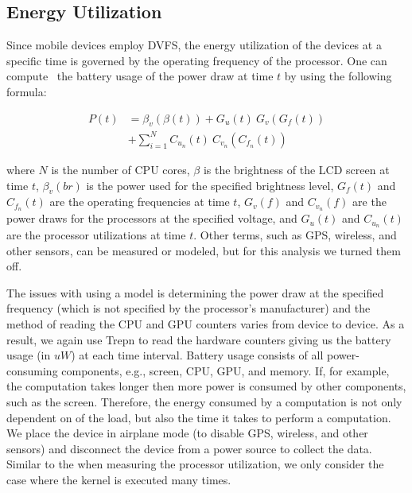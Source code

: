 \subsection{Energy Utilization}


Since mobile devices employ DVFS,
  the energy utilization of the devices at a specific time is governed by
  the operating frequency of the processor.
One can compute~\cite{zhang2010accurate, dong2011self} the battery usage of the
power draw at time $t$ by using the following formula:

\begin{align*}
P(t) &= \beta_v(\beta(t)) + G_u(t) ~ G_v(G_f(t)) \\
     &+ \sum_{i=1}^{N} C_{u_n}(t) ~ C_{v_n}(C_{f_n}(t))
\end{align*}

where $N$ is the number of CPU cores, $\beta$ is the brightness of the LCD screen at time $t$, $\beta_v(br)$ is the power used for the specified brightness level, $G_f(t)$ and $C_{f_n}(t)$ are the operating frequencies at time $t$, $G_v(f)$ and $ C_{v_n}(f)$ are the power draws for the processors at the specified voltage, and $G_u(t)$ and $C_{u_n}(t)$ are the processor utilizations at time $t$.
Other terms, such as GPS, wireless, and other sensors, can be measured or modeled, but for this analysis we turned them off.

The issues with using a model is determining the power draw at the specified
  frequency (which is not specified by the processor's manufacturer) and the method of reading
  the CPU and GPU counters varies from device to device.
As a result, we again use Trepn to read the hardware counters giving us the battery usage (in $uW$) at each time interval.
Battery usage consists of all power-consuming components, e.g., screen, CPU, GPU, and memory.
If, for example, the computation takes longer then more power is consumed by other components, such as the screen.
Therefore, the energy consumed by a computation is not only dependent on of the load, but also the time it takes to perform a computation.
We place the device in airplane mode (to disable GPS, wireless, and other sensors) and disconnect the device from a power source to 
  collect the data.
Similar to the when measuring the processor utilization, we only consider the case where the kernel is executed many times.

